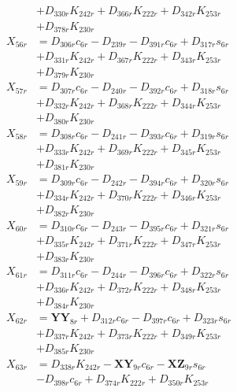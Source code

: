 \begin{multicols}{2}
\begin{align}
&+ D_{330r}K_{242r} + D_{366r}K_{222r} + D_{342r}K_{253r}  \nonumber \\
&+ D_{378r}K_{230r} \nonumber \\
X_{56r} &= D_{306r}c_{6r} - D_{239r} - D_{391r}c_{6r} + D_{317r}s_{6r}  \nonumber \\
&+ D_{331r}K_{242r} + D_{367r}K_{222r} + D_{343r}K_{253r}  \nonumber \\
&+ D_{379r}K_{230r} \nonumber \\
X_{57r} &= D_{307r}c_{6r} - D_{240r} - D_{392r}c_{6r} + D_{318r}s_{6r}  \nonumber \\
&+ D_{332r}K_{242r} + D_{368r}K_{222r} + D_{344r}K_{253r}  \nonumber \\
&+ D_{380r}K_{230r} \nonumber \\
X_{58r} &= D_{308r}c_{6r} - D_{241r} - D_{393r}c_{6r} + D_{319r}s_{6r}  \nonumber \\
&+ D_{333r}K_{242r} + D_{369r}K_{222r} + D_{345r}K_{253r}  \nonumber \\
&+ D_{381r}K_{230r} \nonumber \\
X_{59r} &= D_{309r}c_{6r} - D_{242r} - D_{394r}c_{6r} + D_{320r}s_{6r}  \nonumber \\
&+ D_{334r}K_{242r} + D_{370r}K_{222r} + D_{346r}K_{253r}  \nonumber \\
&+ D_{382r}K_{230r} \nonumber \\
X_{60r} &= D_{310r}c_{6r} - D_{243r} - D_{395r}c_{6r} + D_{321r}s_{6r}  \nonumber \\
&+ D_{335r}K_{242r} + D_{371r}K_{222r} + D_{347r}K_{253r}  \nonumber \\
&+ D_{383r}K_{230r} \nonumber \\
X_{61r} &= D_{311r}c_{6r} - D_{244r} - D_{396r}c_{6r} + D_{322r}s_{6r}  \nonumber \\
&+ D_{336r}K_{242r} + D_{372r}K_{222r} + D_{348r}K_{253r}  \nonumber \\
&+ D_{384r}K_{230r} \nonumber \\
X_{62r} &= \mathbf{YY}_{8r} + D_{312r}c_{6r} - D_{397r}c_{6r} + D_{323r}s_{6r}  \nonumber \\
&+ D_{337r}K_{242r} + D_{373r}K_{222r} + D_{349r}K_{253r}  \nonumber \\
&+ D_{385r}K_{230r} \nonumber \\
X_{63r} &= D_{338r}K_{242r} - \mathbf{XY}_{9r}c_{6r} - \mathbf{XZ}_{9r}s_{6r}  \nonumber \\
&- D_{398r}c_{6r} + D_{374r}K_{222r} + D_{350r}K_{253r}  \nonumber \\

\end{align}
\end{multicols}
